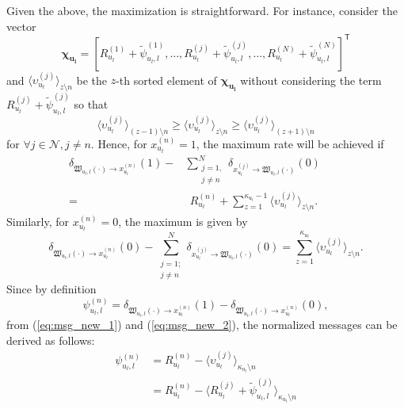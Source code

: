 \documentclass[twocolumn,10pt]{IEEEtran}
\begin{document}
Given the above, the maximization is straightforward. For instance, consider the vector  $$\boldsymbol {\chi_{u_l}} = \left[ R_{u_l}^{(1)} + \tilde{\psi}_{u_l, l}^{(1)}, \ldots, R_{u_l}^{(j)} + \tilde{\psi}_{u_l, l}^{(j)}, \ldots, R_{u_l}^{(N)} + \tilde{\psi}_{u_l, l}^{(N)} \right]^\mathsf{T}$$ and $\langle \upsilon_{u_l}^{(j)}\rangle_{z \setminus n}$ be the $z$-th sorted element of $\boldsymbol {\chi_{u_l}}$ without considering the term $R_{u_l}^{(j)} + \tilde{\psi}_{u_l, l}^{(j)}$ so that $$\langle \upsilon_{u_l}^{(j)}\rangle_{(z-1) \setminus n} \geq \langle \upsilon_{u_l}^{(j)}\rangle_{z \setminus n} \geq \langle \upsilon_{u_l}^{(j)}\rangle_{(z+1) \setminus n}$$ for $\forall j \in \mathcal{N}, j \neq n$. Hence, for $x_{u_l}^{(n)} =1$, the maximum rate will be achieved if \cite{mp-twireless}
\begin{align} \label{eq:msg_new_1}
\delta_{\mathfrak{W}_{u_l, l}(\cdot)  \rightarrow x_{u_l}^{(n)}} \left( 1 \right) -&  \sum_{\substack{j =1, \\ j \neq n}}^N \delta_{x_{u_l}^{(j)} \rightarrow \mathfrak{W}_{u_l, l}(\cdot)   } \left(0 \right)  \hspace{2em} \nonumber \\ =& ~~ R_{u_l}^{(n)} +  \sum_{z=1}^{\kappa_{u_l} - 1} \langle \upsilon_{u_l}^{(j)}\rangle_{z \setminus n}.
\end{align}
Similarly, for $x_{u_l}^{(n)} =0$, the maximum is given by \cite{mp-twireless}
\begin{equation} \label{eq:msg_new_2}
\delta_{\mathfrak{W}_{u_l, l}(\cdot)  \rightarrow x_{u_l}^{(n)}} \left( 0 \right) - \sum_{\substack{j =1; \\ j \neq n}}^N \delta_{x_{u_l}^{(j)} \rightarrow \mathfrak{W}_{u_l, l}(\cdot)   } \left(0 \right) = \sum_{z=1}^{\kappa_{u_l}} \langle \upsilon_{u_l}^{(j)}\rangle_{z \setminus n}.
\end{equation}
Since by definition $$\psi_{u_l, l}^{(n)} = \delta_{\mathfrak{W}_{u_l, l}(\cdot) \rightarrow x_{u_l}^{(n)}     } \left( 1 \right) - \delta_{\mathfrak{W}_{u_l, l}(\cdot) \rightarrow  x_{u_l}^{(n)}    } \left(0 \right),$$ from (\ref{eq:msg_new_1}) and (\ref{eq:msg_new_2}), the normalized messages can be derived as follows:
\begin{align} \label{eq:message_ue2rb}
\psi_{u_l, l}^{(n)} &= R_{u_l}^{(n)} - \langle \upsilon_{u_l}^{(j)}\rangle_{\kappa_{u_l} \setminus n} \nonumber \\
&= R_{u_l}^{(n)} - \langle R_{u_l}^{(j)} + \tilde{\psi}_{u_l, l}^{(j)} \rangle_{\kappa_{u_l} \setminus n}
\end{align}
\end{document}
